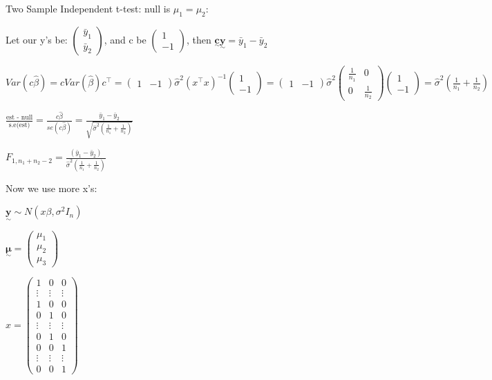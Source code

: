 \documentclass{article}
\newcommand{\svec}[1]{\underset{\sim}{\bm{#1}}} %
\begin{document}
Two Sample Independent t-test: null is $\mu_1 = \mu_2$: 

Let our y's be: $\begin{pmatrix} \bar{y}_1 \\ \bar{y}_2 \end{pmatrix}$, and c be $\begin{pmatrix} 1 \\ -1 \end{pmatrix}$, then $\svec{c}\svec{y} = \bar{y}_1 - \bar{y}_2$

$Var(c\hat{\beta}) = cVar(\hat{\beta})c^{\top} = \begin{pmatrix} 1 & -1 \end{pmatrix} \hat{\sigma}^2 (x^{\top}x)^{-1} \begin{pmatrix} 1 \\ -1 \end{pmatrix} = \begin{pmatrix} 1 & -1 \end{pmatrix} \hat{\sigma}^2 \begin{pmatrix} \frac{1}{n_1} & 0 \\ 0 & \frac{1}{n_2} \end{pmatrix} \begin{pmatrix} 1 \\ -1 \end{pmatrix} = \hat{\sigma}^2 (\frac{1}{n_1} + \frac{1}{n_2})$

$\frac{\text{est - null}}{\text{s.e(est)}} = \frac{c\hat{\beta}}{se(c\hat{\beta})} = \frac{\bar{y}_1 - \bar{y}_2}{\sqrt{\hat{\sigma}^2(\frac{1}{n_1} + \frac{1}{n_2})}}$

$F_{1, n_1+n_2-2} = \frac{(\bar{y}_1 - \bar{y}_2)}{\hat{\sigma}^2(\frac{1}{n_1} + \frac{1}{n_2})}$ 


Now we use more x's:

$\svec{y} \sim N(x\beta, \sigma^2 I_n)$

$\svec{\mu} = \begin{pmatrix} \mu_1 \\ \mu_2 \\ \mu_3 \end{pmatrix}$

$x = \begin{pmatrix} 1 & 0 & 0 \\ \vdots & \vdots & \vdots \\ 1 & 0 & 0 \\ 0 & 1 & 0 \\  \vdots & \vdots & \vdots \\ 0 & 1 & 0 \\ 0 & 0 & 1 \\ \vdots & \vdots & \vdots\\ 0 & 0 & 1 \end{pmatrix}$
\end{document}
